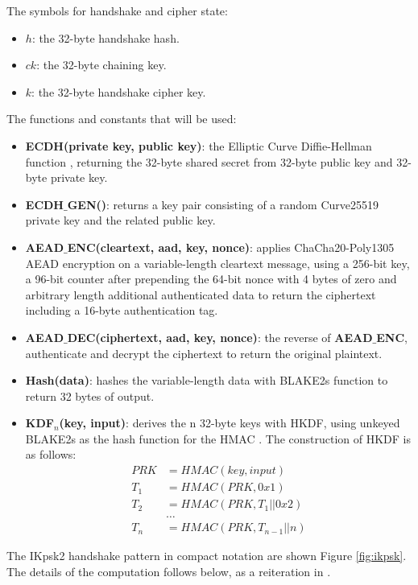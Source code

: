   The symbols for handshake and cipher state:
    \begin{itemize}
      \item $h$: the 32-byte handshake hash.
      \item $ck$: the 32-byte chaining key.
      \item $k$: the 32-byte handshake cipher key.
    \end{itemize}
  
  The functions and constants that will be used:
    \begin{itemize}
      \item \textbf{ECDH(private key, public key)}: the Elliptic Curve Diffie-Hellman function \cite{curve},
      returning the 32-byte shared secret from 32-byte public key and 32-byte private key.
      \item \textbf{ECDH$\_$GEN()}: returns a key pair consisting of a random Curve25519 private key and
      the related public key.
      \item \textbf{AEAD$\_$ENC(cleartext, aad, key, nonce)}: applies ChaCha20-Poly1305 AEAD encryption
      on a variable-length cleartext message, using a 256-bit key, a 96-bit counter after prepending the 64-bit nonce
      with 4 bytes of zero and arbitrary length additional authenticated data to return the ciphertext
      including a 16-byte authentication tag.
      \item \textbf{AEAD$\_$DEC(ciphertext, aad, key, nonce)}: the reverse of \textbf{AEAD$\_$ENC},
      authenticate and decrypt the ciphertext to return the original plaintext.
      \item \textbf{Hash(data)}: hashes the variable-length data with BLAKE2s function to return
      32 bytes of output.
      \item \textbf{KDF$_n$(key, input)}: derives the n 32-byte keys with HKDF, using unkeyed 
      BLAKE2s as the hash function for the HMAC \cite[section 13.2]{crypto}. The construction of
      HKDF is as follows:
      \begin{align*}
        PRK  &= HMAC(key, input) \\
        T_1  &= HMAC(PRK, 0x1) \\
        T_2  &= HMAC(PRK, T_1 || 0x2) \\
        &\dots \\
        T_n  &= HMAC(PRK, T_{n - 1} || n)
    \end{align*}
    \end{itemize}

    The IKpsk2 handshake pattern in compact notation are shown Figure \ref{fig:ikpsk}. The details of the
    computation follows below, as a reiteration in \cite[p.~15]{pwu}.

